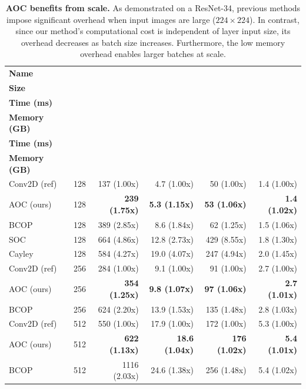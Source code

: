 \begin{table}[ht]
    \centering
    \small
    \begin{tabular}{lrrrrr}
        \textbf{Name} & \makecell[r]{\textbf{Batch}\\\textbf{Size}} & \makecell[r]{\textbf{Train}\\\textbf{Time (ms)}} & \makecell[r]{\textbf{Train}\\\textbf{Memory (GB)}} & \makecell[r]{\textbf{Test}\\\textbf{Time (ms)}} & \makecell[r]{\textbf{Test}\\\textbf{Memory (GB)}} \\
        \hline
            Conv2D (ref) & 128 & 137 (1.00x) & 4.7 (1.00x) & 50 (1.00x) & 1.4 (1.00x) \\
            AOC (ours) & 128 & \textbf{239 (1.75x)} & \textbf{5.3 (1.15x)} & \textbf{53 (1.06x)} & \textbf{1.4 (1.02x)} \\ 
            BCOP & 128 & 389 (2.85x) & 8.6 (1.84x) & 62 (1.25x) & 1.5 (1.06x) \\
            SOC & 128 & 664 (4.86x) & 12.8 (2.73x) & 429 (8.55x) & 1.8 (1.30x) \\
            Cayley & 128 & 584 (4.27x) & 19.0 (4.07x) & 247 (4.94x) & 2.0 (1.45x) \\
        \hline
            Conv2D (ref) & 256 & 284 (1.00x) & 9.1 (1.00x) & 91 (1.00x) & 2.7 (1.00x) \\ 
            AOC (ours) & 256 & \textbf{354 (1.25x)} & \textbf{9.8 (1.07x)} & \textbf{97 (1.06x)} & \textbf{2.7 (1.01x)} \\ 
            BCOP & 256 & 624 (2.20x) & 13.9 (1.53x) & 135 (1.48x) & 2.8 (1.03x) \\
        \hline
            Conv2D (ref) & 512 & 550 (1.00x) & 17.9 (1.00x) & 172 (1.00x) & 5.3 (1.00x) \\
            AOC (ours) & 512 & \textbf{622 (1.13x)} & \textbf{18.6 (1.04x)} & \textbf{176 (1.02x)} & \textbf{5.4 (1.01x)} \\ 
            BCOP & 512 & 1116 (2.03x) & 24.6 (1.38x) & 256 (1.48x) & 5.4 (1.02x) \\
    \end{tabular}
    \caption{\textbf{AOC benefits from scale.} As demonstrated on a ResNet-34, previous methods impose significant overhead when input images are large ($224 \times 224$). In contrast, since our method's computational cost is independent of layer input size, its overhead decreases as batch size increases. Furthermore, the low memory overhead enables larger batches at scale.\vspace{-4mm}}
    \label{tab:comparison_overhead}
\end{table}